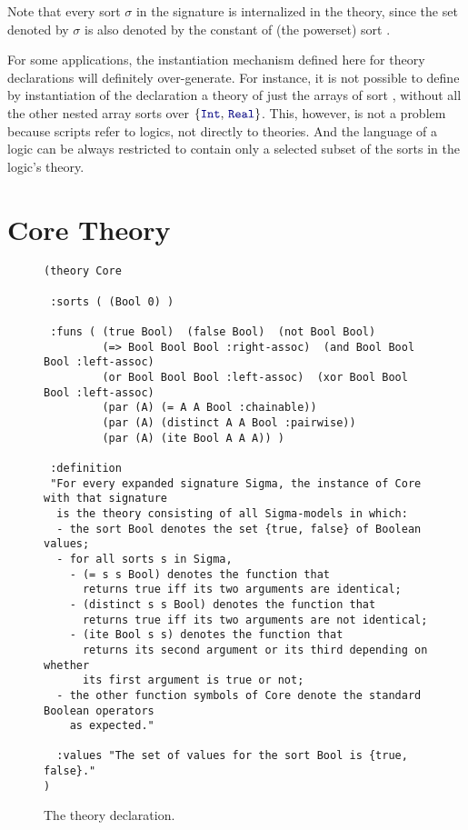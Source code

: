 %
Note that every sort $\sigma$ in the signature is internalized in the theory, 
since the set denoted by $\sigma$ is also denoted 
by the constant  of (the powerset) sort .


\smallskip
\begin{remark}
For some applications, 
the instantiation mechanism defined here for theory declarations
will definitely over-generate.
For instance, it is not possible to define by instantiation of
the  declaration 
a theory of just the arrays of sort ,
without all the other nested array sorts over $\{\ter{Int},\, \ter{Real}\}$.
This, however, is not a problem
because scripts refer to logics, not directly to theories.
And the language of a logic can be always restricted to contain only
a selected subset of the sorts in the logic's theory.
\end{remark}


\section{Core Theory}
\label{sec:core}


\begin{figure}[t]
\small
{\color{NavyBlue}
\begin{verbatim}
(theory Core

 :sorts ( (Bool 0) )

 :funs ( (true Bool)  (false Bool)  (not Bool Bool)
         (=> Bool Bool Bool :right-assoc)  (and Bool Bool Bool :left-assoc)
         (or Bool Bool Bool :left-assoc)  (xor Bool Bool Bool :left-assoc)
         (par (A) (= A A Bool :chainable))
         (par (A) (distinct A A Bool :pairwise))
         (par (A) (ite Bool A A A)) )

 :definition
 "For every expanded signature Sigma, the instance of Core with that signature
  is the theory consisting of all Sigma-models in which: 
  - the sort Bool denotes the set {true, false} of Boolean values;
  - for all sorts s in Sigma, 
    - (= s s Bool) denotes the function that
      returns true iff its two arguments are identical;
    - (distinct s s Bool) denotes the function that
      returns true iff its two arguments are not identical;
    - (ite Bool s s) denotes the function that
      returns its second argument or its third depending on whether 
      its first argument is true or not;
  - the other function symbols of Core denote the standard Boolean operators
    as expected."
  
  :values "The set of values for the sort Bool is {true, false}." 
)
\end{verbatim}
}%
\caption{The  theory declaration.}
\label{fig:Core}
\end{figure}

